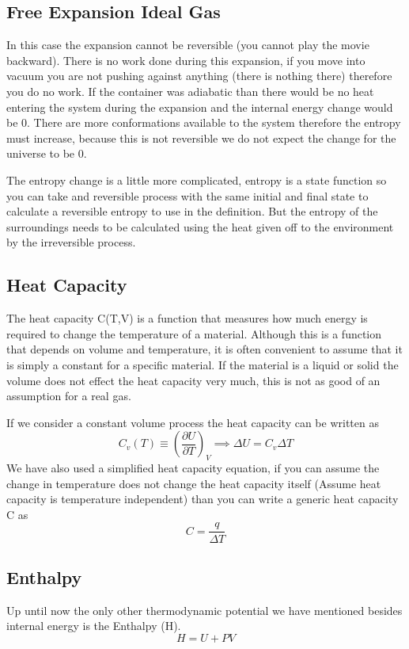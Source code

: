 \documentclass{article}
\begin{document}
 \subsection{Free Expansion Ideal Gas}
In this case the expansion cannot be reversible (you cannot play the movie backward). 
There is no work done during this expansion, if you move into vacuum you are not pushing against anything (there is nothing there) therefore you do no work. 
If the container was adiabatic than there would be no heat entering the system during the expansion and the internal energy change would be 0.
There are more conformations available to the system therefore the entropy must increase, because this is not reversible we do not expect the change for the universe to be 0. 

The entropy change is a little  more complicated, entropy is a state function so you can take and reversible process with the same initial and final state to calculate a reversible entropy to use in the definition. 
But the entropy of the surroundings needs to be calculated using the heat given off to the environment by the irreversible process. 

 \subsection{Heat Capacity}
 The heat capacity C(T,V) is a function that measures how much energy is required to change the temperature of a material. 
 Although this is a function that depends on volume and temperature, it is often convenient to assume that it is simply a constant for a specific material. 
 If the material is a liquid or solid the volume does not effect the heat capacity very much, this is not as good of an assumption for a real gas. 
 
If we consider a constant volume process the heat capacity can be written as 
\begin{equation}
C_v(T) \equiv \left(\frac{\partial U}{\partial T}\right)_V \implies \Delta U = C_v\Delta T
\end{equation}
 We have also used a simplified heat capacity equation, if you can assume the change in temperature does not change the heat capacity itself (Assume heat capacity is temperature independent) than you can write a generic heat capacity C as
 \begin{equation}
     C = \frac{q}{\Delta T}
 \end{equation}
 
 
 \subsection{Enthalpy}
 Up until now the only other thermodynamic potential we have mentioned besides internal energy is the Enthalpy (H). 
 \begin{equation}
     H = U + PV 
 \end{equation}
 
\end{document}
